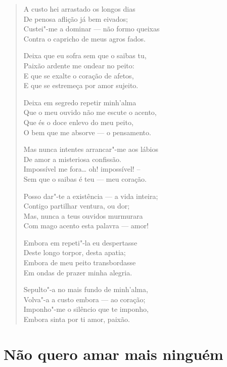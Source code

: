 \begin{verse}
A custo hei arrastado os longos dias\\
De penosa aflição já bem eivados;\\
Custei"-me a dominar --- não formo queixas\\
Contra o capricho de meus agros fados.

Deixa que eu sofra sem que o saibas tu,\\
Paixão ardente me ondear no peito:\\
E que se exalte o coração de afetos,\\
E que se estremeça por amor sujeito.

Deixa em segredo repetir minh'alma\\
Que o meu ouvido não me escute o acento,\\
Que és o doce enlevo do meu peito,\\
O bem que me absorve --- o pensamento.

Mas nunca intentes arrancar"-me aos lábios\\
De amor a misteriosa confissão.\\
Impossível me fora\ldots{} oh! impossível! --\\
Sem que o saibas é teu --- meu coração.

Posso dar"-te a existência --- a vida inteira;\\
Contigo partilhar ventura, ou dor;\\
Mas, nunca a teus ouvidos murmurara\\
Com mago acento esta palavra --- amor!

Embora em repeti"-la eu despertasse\\
Deste longo torpor, desta apatia;\\
Embora de meu peito transbordasse\\
Em ondas de prazer minha alegria.

Sepulto"-a no mais fundo de minh'alma,\\
Volva"-a a custo embora --- ao coração;\\
Imponho"-me o silêncio que te imponho,\\
Embora sinta por ti amor, paixão.
\end{verse}

\chapter{Não quero amar mais ninguém}

